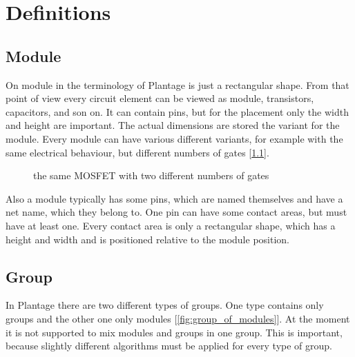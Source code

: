 \chapter{Definitions}

\section{Module}
On module in the terminology of Plantage is just a rectangular shape. From that point of view every circuit element can be viewed as module, transistors, capacitors, and son on. It can contain pins, but for the placement only the width and height are important. The actual dimensions are stored the variant for the module. Every module can have various different variants, for example with the same electrical behaviour, but different numbers of gates [\ref{fig:modules_with_different_gate_number}].

\begin{figure}
	\centering
	
	\caption{the same MOSFET with two different numbers of gates}
	\label{fig:modules_with_different_gate_number}
\end{figure}

Also a module typically has some pins, which are named themselves and have a net name, which they belong to. One pin can have some contact areas, but must have at least one. Every contact area is only a rectangular shape, which has a height and width and is positioned relative to the module position.

\section{Group}
In Plantage there are two different types of groups. One type contains only groups and the other one only modules [\ref{fig:group_of_modules}]. At the moment it is not supported to mix modules and groups in one group. This is important, because slightly different algorithms must be applied for every type of group.


